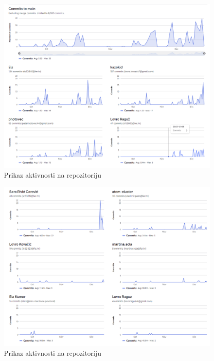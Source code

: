     		\begin{figure}[H]
    		    \centering
    		    \includegraphics[width=\textwidth]{slike/commits_1.png}
    		    \caption{Prikaz aktivnosti na repozitoriju}
    		    \label{fig:my_label}
    		\end{figure}
    		
    	    \begin{figure}
    		    \centering
    		    \includegraphics[width=\textwidth]{slike/commits_2.png}
    		    \caption{Prikaz aktivnosti na repozitoriju}
    		    \label{fig:my_label}
    		\end{figure}
    	\eject